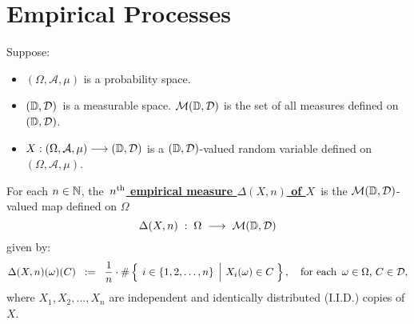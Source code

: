 

\section{Empirical Processes}
\setcounter{theorem}{0}
\setcounter{equation}{0}


\renewcommand{\theenumi}{\roman{enumi}}
\renewcommand{\labelenumi}{\textnormal{(\theenumi)}$\;\;$}


\begin{definition}
\mbox{}\vskip 0.1cm
\noindent
Suppose:
\begin{itemize}
\item
	$(\Omega,\mathcal{A},\mu)$ is a probability space.
\item
	$(\mathbb{D},\mathcal{D})$\, is a measurable space.
	$\mathcal{M}(\mathbb{D},\mathcal{D})$ is the set of all measures defined on $(\mathbb{D},\mathcal{D})$.
\item
	$X : (\Omega,\mathcal{A},\mu) \longrightarrow (\mathbb{D},\mathcal{D})$
	is a $(\mathbb{D},\mathcal{D})$-valued random variable defined on
	$(\Omega,\mathcal{A},\mu)$.
\end{itemize}
For each $n\in\mathbb{N}$, the
\,\underline{\textbf{$n^{\textnormal{th}}$ empirical measure $\Delta(X,n)$ of $X$}}\,
is the $\mathcal{M}(\mathbb{D},\mathcal{D})$-valued map defined on $\Omega$
\begin{equation*}
\Delta(X,n) \; : \; \Omega \;\longrightarrow\; \mathcal{M}(\mathbb{D},\mathcal{D})
\end{equation*}
given by:
\begin{equation*}
\Delta(X,n)(\omega)(C)
\;\; := \;\;
	\dfrac{1}{n} \cdot
	\#\left\{\;
	\left.
		i \overset{{\color{white}.}}{\in} \{1,2,\ldots,n\}
	\;\,\right\vert\,
		X_{i}(\omega) \in C
	\;\right\},
	\quad
	\textnormal{for each \,$\omega\in\Omega$, $C \in \mathcal{D}$},
\end{equation*}
where $X_{1}, X_{2}, \ldots, X_{n}$ are independent and identically distributed (I.I.D.) copies of $X$.
\end{definition}

